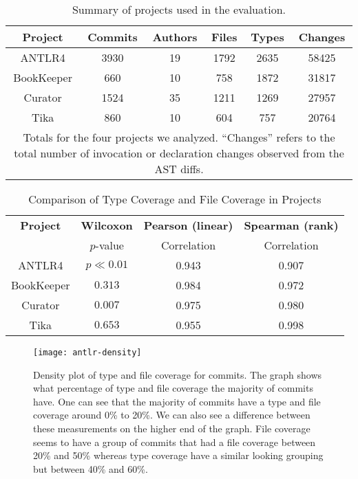 
\begin{table}[t]
\renewcommand{\arraystretch}{1.3}
\centering
\caption{Summary of projects used in the evaluation.}
\label{tab:project-summary}
\begin{tabular}{c|ccccc}
\hline
\bfseries Project & \bfseries Commits & \bfseries Authors & \bfseries Files &   \bfseries Types &  \bfseries  Changes\\
\hline
ANTLR4 & 3930 & 19 & 1792 & 2635 & 58425\\
BookKeeper & 660 & 10 & 758 & 1872 & 31817\\
Curator & 1524 & 35 & 1211 & 1269 & 27957\\
Tika & 860 & 10 & 604 & 757 & 20764\\
\hline
\multicolumn{6}{p{3.25in}}{\footnotesize Totals for the four projects we analyzed. ``Changes'' refers to the total number of invocation or declaration changes observed from the AST diffs.}
\end{tabular}
\end{table}

\begin{table}[ht]
\renewcommand{\arraystretch}{1.3}
\caption{Comparison of Type Coverage and File Coverage in Projects}
\label{tab:summary}
\centering
\begin{tabular}{c|ccc}
\hline
\bfseries Project & \bfseries Wilcoxon& \bfseries Pearson (linear) & \bfseries Spearman (rank) \\
& $p$-value & Correlation & Correlation \\
\hline
ANTLR4 & $p\ll0.01$ & 0.943 & 0.907\\
BookKeeper & $0.313$ & 0.984 & 0.972\\
Curator & $0.007$ & 0.975 & 0.980\\
Tika & $0.653$ & 0.955 & 0.998\\
\hline
\end{tabular}
\end{table}

\begin{figure}[ht]
\centering
\texttt{[image: antlr-density]}
\caption{Density plot of type and file coverage for commits. The graph shows what percentage of type and file coverage the majority of commits have. One can see that the majority of commits have a type and file coverage around 0\% to 20\%. We can also see a difference between these measurements on the higher end of the graph. File coverage seems to have a group of commits that had a file coverage between 20\% and 50\% whereas type coverage have a similar looking grouping but between 40\% and 60\%.\label{fig:antlr4-density}}
\end{figure}

